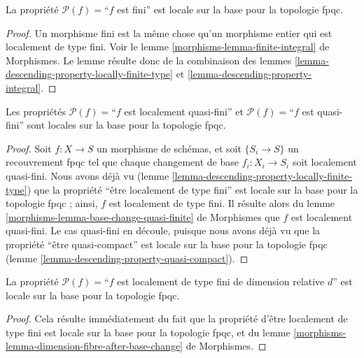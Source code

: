 \begin{lemma}
\label{lemma-descending-property-finite}
La propriété $\mathcal{P}(f) =$``$f$ est fini''
est locale sur la base pour la topologie fpqc.
\end{lemma}

\begin{proof}
Un morphisme fini est la même chose qu'un morphisme entier
qui est localement de type fini. Voir
le lemme \ref{morphisms-lemma-finite-integral} de Morphismes.
Le lemme résulte donc de la combinaison des
lemmes \ref{lemma-descending-property-locally-finite-type}
et \ref{lemma-descending-property-integral}.
\end{proof}

\begin{lemma}
\label{lemma-descending-property-quasi-finite}
Les propriétés
$\mathcal{P}(f) =$``$f$ est localement quasi-fini''
et
$\mathcal{P}(f) =$``$f$ est quasi-fini''
sont locales sur la base pour la topologie fpqc.
\end{lemma}

\begin{proof}
Soit $f : X \to S$ un morphisme de schémas, et soit $\{S_i \to S\}$
un recouvrement fpqc tel que chaque changement de base
$f_i : X_i \to S_i$ soit localement quasi-fini.
Nous avons déjà vu
(lemme \ref{lemma-descending-property-locally-finite-type})
que la propriété ``être localement de type fini'' est locale sur la base pour la
topologie fpqc ; ainsi, $f$ est localement de type fini.
Il résulte alors du
lemme \ref{morphisms-lemma-base-change-quasi-finite} de Morphismes
que $f$ est localement quasi-fini. Le cas quasi-fini en découle,
puisque nous avons déjà vu que la propriété ``être quasi-compact'' est locale
sur la base pour la topologie fpqc
(lemme \ref{lemma-descending-property-quasi-compact}).
\end{proof}

\begin{lemma}
\label{lemma-descending-property-relative-dimension-d}
La propriété $\mathcal{P}(f) =$``$f$ est localement de type fini
de dimension relative $d$'' est locale sur la base pour la topologie fpqc.
\end{lemma}

\begin{proof}
Cela résulte immédiatement du fait que la propriété d'être localement de type
fini est locale sur la base pour la topologie fpqc, et du
lemme \ref{morphisms-lemma-dimension-fibre-after-base-change} de Morphismes.
\end{proof}

